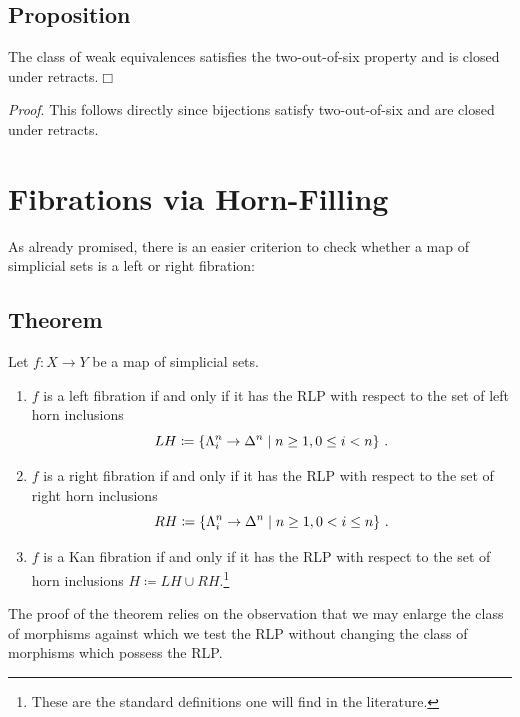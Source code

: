     \subsection{Proposition}
        The class of weak equivalences satisfies the two-out-of-six property and is closed under retracts.\hfill$\Box$
        \smallskip

        \emph{Proof}. This follows directly since bijections satisfy two-out-of-six and are closed under retracts.

\section{Fibrations via Horn-Filling}
    As already promised, there is an easier criterion to check whether a map of simplicial sets is a left or right fibration:

    \subsection{Theorem}\label{chV-2-1}
        Let $f \colon X \to Y$ be a map of simplicial sets.
        \begin{enumerate}[label=\roman*)]
            \item 
                $f$ is a left fibration if and only if it has the RLP with respect to the set of left horn inclusions
                \begin{equation*}
                    LH \coloneq \left\{ \Lambda^{n}_{i} \to \Delta^n \mid n \geq 1, 0 \leq i < n \right\} \,. 
                \end{equation*}
            \item 
                $f$ is a right fibration if and only if it has the RLP with respect to the set of right horn inclusions
                \begin{equation*}
                    RH \coloneq \left\{ \Lambda^{n}_{i} \to \Delta^n \mid n \geq 1, 0 < i \leq n \right\} \,.
                \end{equation*}
            \item 
                $f$ is a Kan fibration if and only if it has the RLP with respect to the set of horn inclusions $H \coloneq LH \cup RH$.\footnote{These are the standard definitions one will find in the literature.}            
            \end{enumerate}
            The proof of the theorem relies on the observation that we may enlarge the class of morphisms against which we test the RLP without changing the class of morphisms which possess the RLP.

